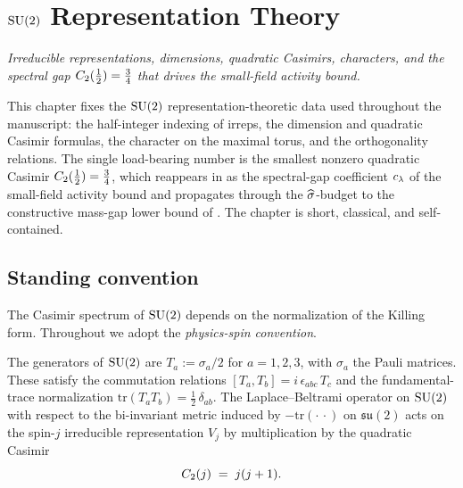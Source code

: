 %

\chapter{\texorpdfstring{$\mathrm{SU}(2)$}{SU(2)} Representation Theory}
\label{ch:su2-rep-theory}

\noindent\emph{Irreducible representations, dimensions, quadratic
Casimirs, characters, and the spectral gap $C_2(\tfrac12) =
\tfrac34$ that drives the small-field activity bound.}

This chapter fixes the $\mathrm{SU}(2)$ representation-theoretic data used
throughout the manuscript: the half-integer indexing of irreps, the
dimension and quadratic Casimir formulas, the character on the
maximal torus, and the orthogonality relations.  The single
load-bearing number is the smallest nonzero quadratic Casimir
$C_2(\tfrac12) = \tfrac34$, which reappears in
 as the spectral-gap coefficient $c_\lambda$
of the small-field activity bound and propagates through the
$\widehat{\sigma}$-budget to the constructive mass-gap lower bound of
.  The chapter is short, classical, and
self-contained.

\section{Standing convention}
\label{sec:su2-rep-convention}

%
The Casimir spectrum of $\mathrm{SU}(2)$ depends on the normalization of the
Killing form.  Throughout we adopt the \emph{physics-spin convention}.

\begin{convention}
\label{conv:physics-spin}
The generators of $\mathrm{SU}(2)$ are
$T_a := \sigma_a / 2$ for $a = 1,2,3$, with $\sigma_a$ the Pauli
matrices.  These satisfy the commutation relations
$[T_a, T_b] = i\,\epsilon_{abc}\, T_c$ and the fundamental-trace
normalization $\mathrm{tr}(T_a T_b) = \tfrac12\,\delta_{ab}$.  The
Laplace--Beltrami operator on $\mathrm{SU}(2)$ with respect to the
bi-invariant metric induced by $-\mathrm{tr}(\cdot\,\cdot)$ on
$\mathfrak{su}(2)$ acts on the spin-$j$ irreducible representation
$V_j$ by multiplication by the quadratic Casimir
\begin{equation}
  \label{eq:casimir-formula}
  C_2(j) \;=\; j(j+1) .
\end{equation}
\end{convention}

